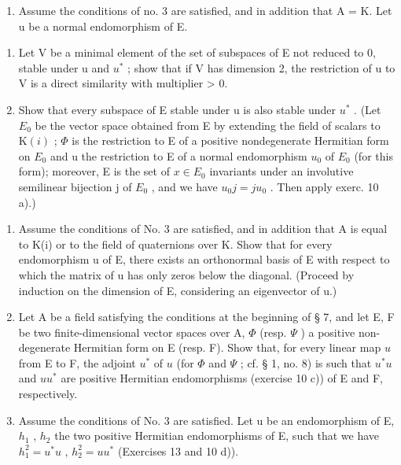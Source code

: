 \begin{enumerate}
\def\labelenumi{\arabic{enumi})}
\setcounter{enumi}{10}
\tightlist
\item
  Assume the conditions of no. 3 are satisfied, and in addition that A = K. Let u be a normal endomorphism of E.
\end{enumerate}

\begin{enumerate}
\def\labelenumi{\alph{enumi})}
\item
  Let V be a minimal element of the set of subspaces of E not reduced to 0, stable under u and \(u^{*}\) ; show that if V has dimension 2, the restriction of u to V is a direct similarity with multiplier \textgreater{} 0.
\item
  Show that every subspace of E stable under u is also stable under \(u^{*}\) . (Let \(E_{0}\) be the vector space obtained from E by extending the field of scalars to \(\mathrm{K}(i)\) ; \(\Phi\) is the restriction to E of a positive nondegenerate Hermitian form on \(E_{0}\) and u the restriction to E of a normal endomorphism \(u_{0}\) of \(E_{0}\) (for this form); moreover, E is the set of \(x \in E_{0}\) invariants under an involutive semilinear bijection j of \(E_{0}\) , and we have \(u_{0}j = ju_{0}\) . Then apply exerc. 10 a).)
\end{enumerate}

\begin{enumerate}
\def\labelenumi{\arabic{enumi})}
\setcounter{enumi}{11}
\item
  Assume the conditions of No. 3 are satisfied, and in addition that A is equal to K(i) or to the field of quaternions over K. Show that for every endomorphism u of E, there exists an orthonormal basis of E with respect to which the matrix of u has only zeros below the diagonal. (Proceed by induction on the dimension of E, considering an eigenvector of u.)
\item
  Let A be a field satisfying the conditions at the beginning of § 7, and let E, F be two finite-dimensional vector spaces over A, \(\Phi\) (resp. \(\Psi\) ) a positive non-degenerate Hermitian form on E (resp. F). Show that, for every linear map \(u\) from E to F, the adjoint \(u^{*}\) of \(u\) (for \(\Phi\) and \(\Psi\) ; cf. § 1, no. 8) is such that \(u^{*}u\) and \(uu^{*}\) are positive Hermitian endomorphisms (exercise 10 c)) of E and F, respectively.
\item
  Assume the conditions of No. 3 are satisfied. Let u be an endomorphism of E, \(h_{1}\) , \(h_{2}\) the two positive Hermitian endomorphisms of E, such that we have \(h_{1}^{2}=u^{*}u\) , \(h_{2}^{2}=uu^{*}\) (Exercises 13 and 10 d)).
\end{enumerate}

